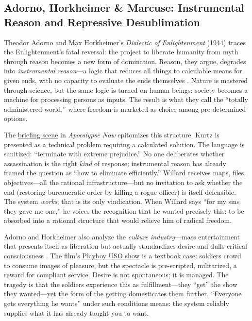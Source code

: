 \subsection*{Adorno, Horkheimer \& Marcuse: Instrumental Reason and Repressive Desublimation}
\label{ssec:v-adorno-horkheimer-marcuse}
Theodor Adorno and Max Horkheimer's \textit{Dialectic of Enlightenment} (1944) traces the
Enlightenment's fatal reversal: the project to liberate humanity from myth through reason
becomes a new form of domination. Reason, they argue, degrades into \emph{instrumental
	reason}---a logic that reduces all things to calculable means for given ends, with no capacity
to evaluate the ends themselves \parencite{AdornoHorkheimer2002}. Nature is mastered through
science, but the same logic is turned on human beings: society becomes a machine for
processing persons as inputs. The result is what they call the ``totally administered world,''
where freedom is marketed as choice among pre-determined options.

The \hyperref[scene:briefing]{briefing scene} in \textit{Apocalypse Now} epitomizes this
structure. Kurtz is presented as a technical problem requiring a calculated solution. The
language is sanitized: ``terminate with extreme prejudice.'' No one deliberates whether
assassination is the right \emph{kind} of
response; instrumental reason has already framed the question as ``how to eliminate
efficiently.'' Willard receives maps, files, objectives---all the rational infrastructure---but
no invitation to ask whether the end (restoring bureaucratic order by killing a rogue officer)
is itself defensible. The system \emph{works}; that is its only vindication. When Willard says
``for my sins they gave me one,'' he voices the recognition that he wanted precisely this: to
be absorbed into a rational structure that would relieve him of radical freedom.

Adorno and Horkheimer also analyze the \emph{culture industry}---mass entertainment that
presents itself as liberation but actually standardizes desire and dulls critical consciousness
\parencite{AdornoHorkheimer2002}. The film's \hyperref[scene:playboy-show]{Playboy USO show} is
a textbook case: soldiers crowd to consume images of pleasure, but the spectacle is
pre-scripted, militarized, a reward for compliant service. Desire is not spontaneous; it is
managed. The tragedy is that the
soldiers experience this as fulfillment---they ``get'' the show they wanted---yet the form of
the getting domesticates them further. ``Everyone gets everything he wants'' under such
conditions means: the system reliably supplies what it has already taught you to want.

